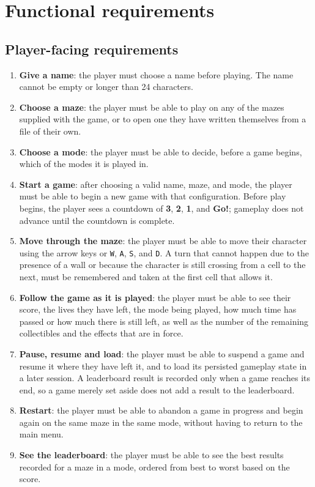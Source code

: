 \section{Functional requirements}

\subsection{Player-facing requirements}

\begin{enumerate}[label=\textbf{FR-U\arabic*}]
  \item \textbf{Give a name}: the player must choose a name before playing. The name cannot be empty or longer
  than 24 characters.
  \item \textbf{Choose a maze}: the player must be able to play on any of the mazes supplied with the game,
  or to open one they have written themselves from a file of their own.
  \item \textbf{Choose a mode}: the player must be able to decide, before a game begins, which of the modes
  it is played in.
  \item \textbf{Start a game}: after choosing a valid name, maze, and mode, the player must be able to begin
  a new game with that configuration. Before play begins, the player sees a countdown of \textbf{3}, \textbf{2},
  \textbf{1}, and \textbf{Go!}; gameplay does not advance until the countdown is complete.
  \item \textbf{Move through the maze}: the player must be able to move their character using the arrow keys or
  \texttt{W}, \texttt{A}, \texttt{S}, and \texttt{D}.
  A turn that cannot happen due to the presence of a wall or because the character is still crossing from a cell to the next,
  must be remembered and taken at the first cell that allows it.
  \item \textbf{Follow the game as it is played}: the player must be able to see their score, the lives they have
  left, the mode being played, how much time has passed or how much there is still left, as well as the number
  of the remaining collectibles and the effects that are in force.
  \item \textbf{Pause, resume and load}: the player must be able to suspend a game and resume it where they have
  left it, and to load its persisted gameplay state in a later session. A leaderboard result is recorded only when
  a game reaches its end, so a game merely set aside does not add a result to the leaderboard.
  \item \textbf{Restart}: the player must be able to abandon a game in progress and begin again on the same maze
  in the same mode, without having to return to the main menu.
  \item \textbf{See the leaderboard}: the player must be able to see the best results recorded for a maze in a mode,
  ordered from best to worst based on the score.
\end{enumerate}

